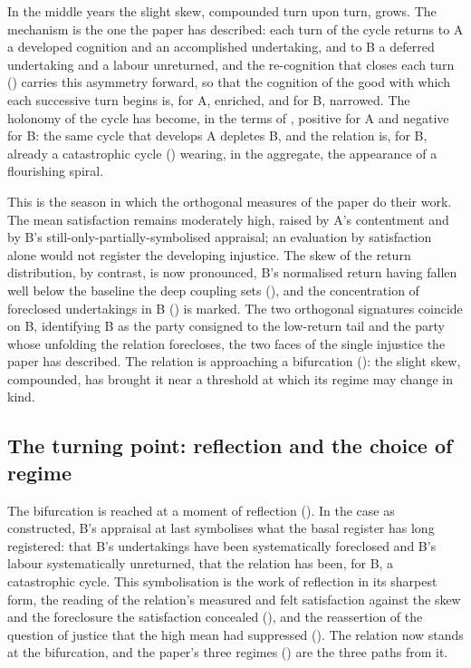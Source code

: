 In the middle years the slight skew, compounded turn upon turn, grows. The mechanism is the one the paper has described: each turn of the cycle returns to A a developed cognition and an accomplished undertaking, and to B a deferred undertaking and a labour unreturned, and the re-cognition that closes each turn () carries this asymmetry forward, so that the cognition of the good with which each successive turn begins is, for A, enriched, and for B, narrowed. The holonomy of the cycle has become, in the terms of , positive for A and negative for B: the same cycle that develops A depletes B, and the relation is, for B, already a catastrophic cycle () wearing, in the aggregate, the appearance of a flourishing spiral.

This is the season in which the orthogonal measures of the paper do their work. The mean satisfaction remains moderately high, raised by A's contentment and by B's still-only-partially-symbolised appraisal; an evaluation by satisfaction alone would not register the developing injustice. The skew of the return distribution, by contrast, is now pronounced, B's normalised return having fallen well below the baseline the deep coupling sets (), and the concentration of foreclosed undertakings in B () is marked. The two orthogonal signatures coincide on B, identifying B as the party consigned to the low-return tail and the party whose unfolding the relation forecloses, the two faces of the single injustice the paper has described. The relation is approaching a bifurcation (): the slight skew, compounded, has brought it near a threshold at which its regime may change in kind.

\subsection{The turning point: reflection and the choice of regime}
\label{p11:sec:case-turning}

The bifurcation is reached at a moment of reflection (). In the case as constructed, B's appraisal at last symbolises what the basal register has long registered: that B's undertakings have been systematically foreclosed and B's labour systematically unreturned, that the relation has been, for B, a catastrophic cycle. This symbolisation is the work of reflection in its sharpest form, the reading of the relation's measured and felt satisfaction against the skew and the foreclosure the satisfaction concealed (), and the reassertion of the question of justice that the high mean had suppressed (). The relation now stands at the bifurcation, and the paper's three regimes () are the three paths from it.

